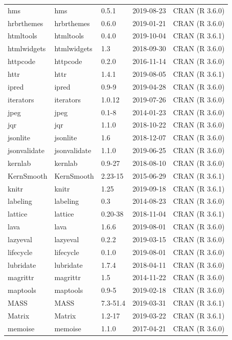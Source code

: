 \documentclass[]{article}
\begin{document}
\begin{longtable}[t]{lllll}
hms & hms & 0.5.1 & 2019-08-23 & CRAN (R 3.6.0)\\
hrbrthemes & hrbrthemes & 0.6.0 & 2019-01-21 & CRAN (R 3.6.0)\\
htmltools & htmltools & 0.4.0 & 2019-10-04 & CRAN (R 3.6.1)\\
\addlinespace
htmlwidgets & htmlwidgets & 1.3 & 2018-09-30 & CRAN (R 3.6.0)\\
httpcode & httpcode & 0.2.0 & 2016-11-14 & CRAN (R 3.6.0)\\
httr & httr & 1.4.1 & 2019-08-05 & CRAN (R 3.6.1)\\
ipred & ipred & 0.9-9 & 2019-04-28 & CRAN (R 3.6.0)\\
iterators & iterators & 1.0.12 & 2019-07-26 & CRAN (R 3.6.0)\\
\addlinespace
jpeg & jpeg & 0.1-8 & 2014-01-23 & CRAN (R 3.6.0)\\
jqr & jqr & 1.1.0 & 2018-10-22 & CRAN (R 3.6.0)\\
jsonlite & jsonlite & 1.6 & 2018-12-07 & CRAN (R 3.6.0)\\
jsonvalidate & jsonvalidate & 1.1.0 & 2019-06-25 & CRAN (R 3.6.0)\\
kernlab & kernlab & 0.9-27 & 2018-08-10 & CRAN (R 3.6.0)\\
\addlinespace
KernSmooth & KernSmooth & 2.23-15 & 2015-06-29 & CRAN (R 3.6.1)\\
knitr & knitr & 1.25 & 2019-09-18 & CRAN (R 3.6.1)\\
labeling & labeling & 0.3 & 2014-08-23 & CRAN (R 3.6.0)\\
lattice & lattice & 0.20-38 & 2018-11-04 & CRAN (R 3.6.1)\\
lava & lava & 1.6.6 & 2019-08-01 & CRAN (R 3.6.0)\\
\addlinespace
lazyeval & lazyeval & 0.2.2 & 2019-03-15 & CRAN (R 3.6.0)\\
lifecycle & lifecycle & 0.1.0 & 2019-08-01 & CRAN (R 3.6.0)\\
lubridate & lubridate & 1.7.4 & 2018-04-11 & CRAN (R 3.6.0)\\
magrittr & magrittr & 1.5 & 2014-11-22 & CRAN (R 3.6.0)\\
maptools & maptools & 0.9-5 & 2019-02-18 & CRAN (R 3.6.0)\\
\addlinespace
MASS & MASS & 7.3-51.4 & 2019-03-31 & CRAN (R 3.6.1)\\
Matrix & Matrix & 1.2-17 & 2019-03-22 & CRAN (R 3.6.1)\\
memoise & memoise & 1.1.0 & 2017-04-21 & CRAN (R 3.6.0)\\

\end{longtable}
\end{document}
